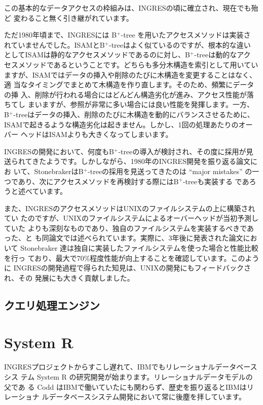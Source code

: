 この基本的なデータアクセスの枠組みは、INGRESの頃に確立され、現在でも殆ど
変わること無く引き継がれています。

ただ1980年頃まで、INGRESには B$^+$-tree を用いたアクセスメソッドは実装さ
れていませんでした。ISAMとB$^+$-treeはよく似ているのですが、根本的な違い
としてISAMは静的なアクセスメソッドであるのに対し、B$^+$-treeは動的なアク
セスメソッドであるということです。どちらも多分木構造を索引として用いてい
ますが、ISAMではデータの挿入や削除のたびに木構造を変更することはなく、適
当なタイミングでまとめて木構造を作り直します。そのため、頻繁にデータの挿
入、削除が行われる場合にはどんどん構造劣化が進み、アクセス性能が落ちてし
まいますが、参照が非常に多い場合には良い性能を発揮します。一方、
B$^+$-treeはデータの挿入、削除のたびに木構造を動的にバランスさせるために、
ISAMで起きるような構造劣化は起きません。しかし、1回の処理あたりのオーバー
ヘッドはISAMよりも大きくなってしまいます。

INGRESの開発において、何度もB$^+$-treeの導入が検討され、その度に採用が見
送られてきたようです。しかしながら、1980年のINGRES開発を振り返る論文にお
いて、StonebrakerはB$^+$-treeの採用を見送ってきたのは ``major mistakes''
の一つであり、次にアクセスメソッドを再検討する際にはB$^+$-treeも実装する
であろうと述べています。

また、INGRESのアクセスメソッドはUNIXのファイルシステムの上に構築されてい
たのですが、UNIXのファイルシステムによるオーバーヘッドが当初予測していた
よりも深刻なものであり、独自のファイルシステムを実装するべきであった、と
も同論文では述べられています。実際に、3年後に発表された論文において
Stonebraker 達は独自に実装したファイルシステムを使った場合と性能比較を行っ
ており、最大で70\%程度性能が向上することを確認しています。このように
INGRESの開発過程で得られた知見は、UNIXの開発にもフィードバックされ、その
発展にも大きく貢献しました。

\subsection{クエリ処理エンジン}

\section{System R}

INGRESプロジェクトからすこし遅れて、IBMでもリレーショナルデータベースシス
テム System R の研究開発が始まります。リレーショナルデータモデルの父であ
る Codd はIBMで働いていたにも関わらず、歴史を振り返るとIBMはリレーショナ
ルデータベースシステム開発において常に後塵を拝しています。

